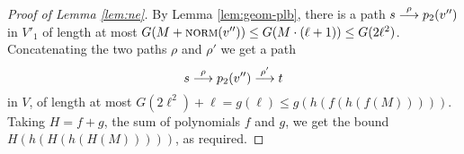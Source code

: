 \begin{proof}[Proof of Lemma \ref{lem:ne}]
\smallskip

By Lemma \ref{lem:geom-plb}, there is a path $s\stackrel{\rho}{\longrightarrow} p_2(v'')$ in $V'_1$ of length at most
$G(M + \textsc{norm}(v'')) \leq G(M\cdot(\ell+1)) \leq G(2\ell^2)$.
Concatenating the two paths $\rho$ and $\rho'$ we get a path
\[
s\stackrel{\rho}{\longrightarrow} p_2(v'') \stackrel{\rho'}{\longrightarrow} t
\]
in $V$, of length at most 
$
G(2\ell^2) + \ell = g(\ell) \leq g(h(f(h(f(M))))).
$
Taking $H = f+g$, the sum of polynomials $f$ and $g$, we get the bound
$H(h(H(h(H(M)))))$,
as required.
\end{proof}
